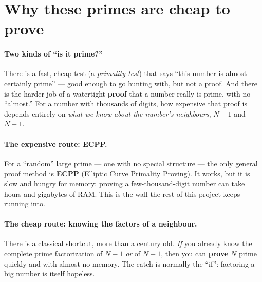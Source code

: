 \documentclass[11pt,a4paper]{article}
\begin{document}
\section{Why these primes are cheap to prove}

\paragraph{Two kinds of ``is it prime?''}
There is a fast, cheap test (a \emph{primality test}) that says ``this number is
almost certainly prime'' --- good enough to go hunting with, but not a proof. And
there is the harder job of a watertight \textbf{proof} that a number really is
prime, with no ``almost.'' For a number with thousands of digits, how expensive
that proof is depends entirely on \emph{what we know about the number's
neighbours}, $N-1$ and $N+1$.

\paragraph{The expensive route: ECPP.}
For a ``random'' large prime --- one with no special structure --- the only
general proof method is \textbf{ECPP} (Elliptic Curve Primality Proving). It
works, but it is slow and hungry for memory: proving a few-thousand-digit number
can take hours and gigabytes of RAM. This is the wall the rest of this project
keeps running into.

\paragraph{The cheap route: knowing the factors of a neighbour.}
There is a classical shortcut, more than a century old. \emph{If} you already
know the complete prime factorization of $N-1$ \emph{or} of $N+1$, then you can
\textbf{prove} $N$ prime quickly and with almost no memory. The catch is normally
the ``if'': factoring a big number is itself hopeless.
\end{document}
